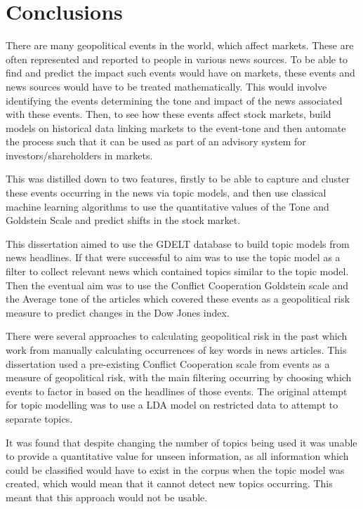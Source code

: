 \section{Conclusions}
\label{conclusions}
There are many geopolitical events in the world, which affect markets. These are often represented and reported to people in various news sources. To be able to find and predict the impact such events would have on markets, these events and news sources would have to be treated mathematically. This would involve identifying the events determining the tone and impact of the news associated with these events. Then, to see how these events affect stock markets, build models on historical data linking markets to the event-tone and then automate the process such that it can be used as part of an advisory system for investors/shareholders in markets. 

This was distilled down to two features, firstly to be able to capture and cluster these events occurring in the news via topic models, and then use classical machine learning algorithms to use the quantitative values of the Tone and Goldstein Scale and predict shifts in the stock market. 

This dissertation aimed to use the GDELT database to build topic models from news headlines. If that were successful to aim was to use the topic model as a filter to collect relevant news which contained topics similar to the topic model. Then the eventual aim was to use the Conflict Cooperation Goldstein scale and the Average tone of the articles which covered these events as a geopolitical risk measure to predict changes in the Dow Jones index. 

There were several approaches to calculating geopolitical risk in the past which work from manually calculating occurrences of key words in news articles. This dissertation used a pre-existing Conflict Cooperation scale from events as a measure of geopolitical risk, with the main filtering occurring by choosing which events to factor in based on the headlines of those events.  The original attempt for topic modelling was to use a LDA model on restricted data to attempt to separate topics.    

It was found that despite changing the number of topics being used it was unable to provide a quantitative value for unseen information, as all information which could be classified would have to exist in the corpus when the topic model was created, which would mean that it cannot detect new topics occurring. This meant that this approach would not be usable.

